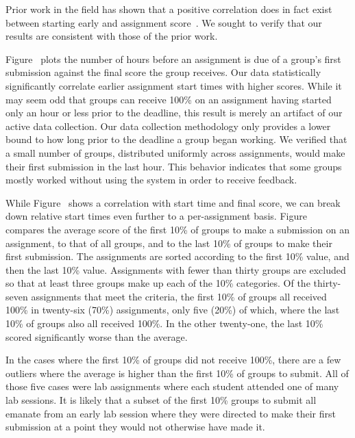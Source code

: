 Prior work in the field has shown that a positive correlation does in fact
exist between starting early and assignment
score~\cite{Spacco:2013:TIP:2462476.2465594,
  Edwards:2009:CEI:1584322.1584325}. We sought to verify that our results are
consistent with those of the prior work.

Figure~ plots the number of hours before an
assignment is due of a group's first submission against the final score the
group receives. Our data statistically significantly correlate earlier
assignment start times with higher scores. While it may seem odd that groups
can receive 100\% on an assignment having started only an hour or less prior to
the deadline, this result is merely an artifact of our active data
collection. Our data collection methodology only provides a lower bound to how
long prior to the deadline a group began working. We verified that a small
number of groups, distributed uniformly across assignments, would make their
first submission in the last hour. This behavior indicates that some groups
mostly worked without using the system in order to receive feedback.

While Figure~ shows a correlation with start
time and final score, we can break down relative start times even further to a
per-assignment basis. Figure~ compares the average
score of the first 10\% of groups to make a submission on an assignment, to
that of all groups, and to the last 10\% of groups to make their first
submission. The assignments are sorted according to the first 10\% value, and
then the last 10\% value. Assignments with fewer than thirty groups are
excluded so that at least three groups make up each of the 10\% categories. Of
the thirty-seven assignments that meet the criteria, the first 10\% of groups
all received 100\% in twenty-six (70\%) assignments, only five (20\%) of which,
where the last 10\% of groups also all received 100\%. In the other twenty-one,
the last 10\% scored significantly worse than the average.

In the cases where the first 10\% of groups did not receive 100\%, there are a
few outliers where the average is higher than the first 10\% of groups to
submit. All of those five cases were lab assignments where each student
attended one of many lab sessions. It is likely that a subset of the first 10\%
groups to submit all emanate from an early lab session where they were directed
to make their first submission at a point they would not otherwise have made
it.

